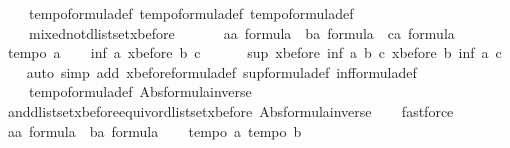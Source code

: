 \begin{isabellebody}
\ \ \ \ tempo{}{\isacharunderscore}formula{\isacharunderscore}def\ tempo{}{\isacharunderscore}formula{\isacharunderscore}def\ tempo{}{\isacharunderscore}formula{\isacharunderscore}def\ \ \isanewline
\ \ \ \ mixed{\isacharunderscore}not{\isacharunderscore}dlistset{\isacharunderscore}xbefore{\isacharparenright}\isanewline
\ \ \isamarkupfalse%
\isanewline
\ \ \isamarkupfalse%
\ a{\isacharcolon}{\isacharcolon}{\isachardoublequoteopen}{\isacharprime}a\ formula{\isachardoublequoteclose}\ \ b{\isacharcolon}{\isacharcolon}{\isachardoublequoteopen}{\isacharprime}a\ formula{\isachardoublequoteclose}\ \ c{\isacharcolon}{\isacharcolon}{\isachardoublequoteopen}{\isacharprime}a\ formula{\isachardoublequoteclose}\isanewline
\ \ \isamarkupfalse%
\ {\isachardoublequoteopen}tempo{}\ a{\isachardoublequoteclose}\isanewline
\ \ \isamarkupfalse%
\ {\isachardoublequoteopen}inf\ a\ {\isacharparenleft}xbefore\ b\ c{\isacharparenright}\ {\isacharequal}\ \isanewline
\ \ \ \ sup\ {\isacharparenleft}xbefore\ {\isacharparenleft}inf\ a\ b{\isacharparenright}\ c{\isacharparenright}\ {\isacharparenleft}xbefore\ b\ {\isacharparenleft}inf\ a\ c{\isacharparenright}{\isacharparenright}{\isachardoublequoteclose}\isanewline
\ \ \isamarkupfalse%
\ {\isacharparenleft}auto\ simp\ add{\isacharcolon}\ xbefore{\isacharunderscore}formula{\isacharunderscore}def\ sup{\isacharunderscore}formula{\isacharunderscore}def\ inf{\isacharunderscore}formula{\isacharunderscore}def\ \isanewline
\ \ \ \ tempo{}{\isacharunderscore}formula{\isacharunderscore}def\ Abs{\isacharunderscore}formula{\isacharunderscore}inverse{\isacharparenright}\isanewline
\ \ \isamarkupfalse%
\ and{\isacharunderscore}dlistset{\isacharunderscore}xbefore{\isacharunderscore}equiv{\isacharunderscore}or{\isacharunderscore}dlistset{\isacharunderscore}xbefore\ Abs{\isacharunderscore}formula{\isacharunderscore}inverse\isanewline
\ \ \isamarkupfalse%
\ fastforce\isanewline
\ \ \isamarkupfalse%
\isanewline
\ \ \isamarkupfalse%
\ a{\isacharcolon}{\isacharcolon}{\isachardoublequoteopen}{\isacharprime}a\ formula{\isachardoublequoteclose}\ \ b{\isacharcolon}{\isacharcolon}{\isachardoublequoteopen}{\isacharprime}a\ formula{\isachardoublequoteclose}\isanewline
\ \ \isamarkupfalse%
\ {\isachardoublequoteopen}tempo{}\ a{\isachardoublequoteclose}\ {\isachardoublequoteopen}tempo{}\ b{\isachardoublequoteclose}\isanewline

\end{isabellebody}
